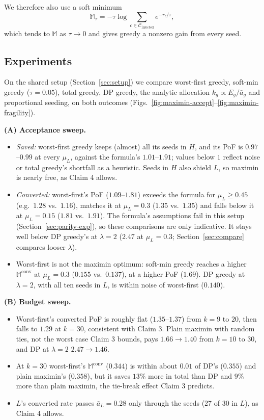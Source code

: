 We therefore also use a soft minimum
\[
\mathbb{M}_\tau=-\tau\log\sum_{c\in\mathcal{C}_{\mathrm{infected}}}e^{-r_c/\tau},
\]
which tends to $\mathbb{M}$ as $\tau\to0$ and gives greedy a nonzero gain from every seed.

\subsection{Experiments}
On the shared setup (Section~\ref{sec:setup}) we compare worst-first greedy, soft-min greedy ($\tau=0.05$), total greedy, DP greedy, the analytic allocation $k_g\propto E_g/\bar a_g$ and proportional seeding, on both outcomes (Figs.~\ref{fig:maximin-accept}--\ref{fig:maximin-fragility}).

\textbf{(A) Acceptance sweep.}
\begin{itemize}
\item \emph{Saved:} worst-first greedy keeps (almost) all its seeds in $H$, and its PoF is $0.97$--$0.99$ at every $\mu_L$, against the formula's $1.01$--$1.91$; values below $1$ reflect noise or total greedy's shortfall as a heuristic. Seeds in $H$ also shield $L$, so maximin is nearly free, as Claim 4 allows.
\item \emph{Converted:} worst-first's PoF ($1.09$--$1.81$) exceeds the formula for $\mu_L\ge0.45$ (e.g.\ $1.28$ vs.\ $1.16$), matches it at $\mu_L=0.3$ ($1.35$ vs.\ $1.35$) and falls below it at $\mu_L=0.15$ ($1.81$ vs.\ $1.91$). The formula's assumptions fail in this setup (Section~\ref{sec:parity-exp}), so these comparisons are only indicative. It stays well below DP greedy's at $\lambda=2$ ($2.47$ at $\mu_L=0.3$; Section~\ref{sec:compare} compares looser $\lambda$).
\item Worst-first is not the maximin optimum: soft-min greedy reaches a higher $\mathbb{M}^{\mathrm{conv}}$ at $\mu_L=0.3$ ($0.155$ vs.\ $0.137$), at a higher PoF ($1.69$). DP greedy at $\lambda=2$, with all ten seeds in $L$, is within noise of worst-first ($0.140$).
\end{itemize}

\textbf{(B) Budget sweep.}
\begin{itemize}
\item Worst-first's converted PoF is roughly flat ($1.35$--$1.37$) from $k=9$ to $20$, then falls to $1.29$ at $k=30$, consistent with Claim 3. Plain maximin with random ties, not the worst case Claim 3 bounds, pays $1.66\to1.40$ from $k=10$ to $30$, and DP at $\lambda=2$ $2.47\to1.46$.
\item At $k=30$ worst-first's $\mathbb{M}^{\mathrm{conv}}$ ($0.344$) is within about $0.01$ of DP's ($0.355$) and plain maximin's ($0.358$), but it saves $13\%$ more in total than DP and $9\%$ more than plain maximin, the tie-break effect Claim 3 predicts.
\item $L$'s converted rate passes $\bar a_L=0.28$ only through the seeds (27 of 30 in $L$), as Claim 4 allows.
\end{itemize}

